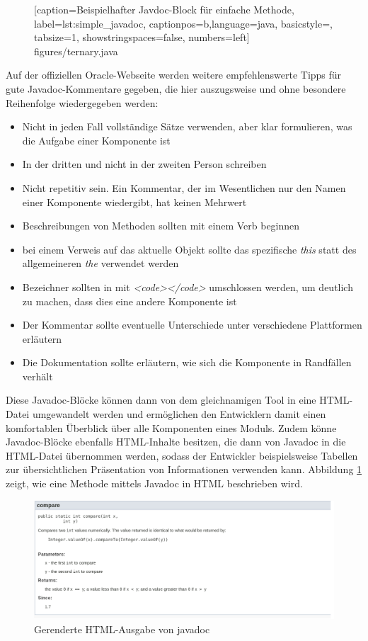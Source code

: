 		\begin{figure}
			
			[caption={Beispielhafter Javdoc-Block für einfache Methode},
			label={lst:simple_javadoc},
			captionpos=b,language=java, basicstyle=\footnotesize, tabsize=1, showstringspaces=false,  numbers=left]
			{figures/ternary.java}
		\end{figure}

Auf der offiziellen Oracle-Webseite werden weitere empfehlenswerte Tipps für gute Javadoc-Kommentare gegeben, die hier auszugsweise und ohne besondere Reihenfolge wiedergegeben werden\cite{HowtoWriteDocCommentsfortheJavadocTool}:
\begin{itemize}
    \item Nicht in jeden Fall vollständige Sätze verwenden, aber klar formulieren, was die Aufgabe einer Komponente ist
    \item In der dritten und nicht in der zweiten Person schreiben
    \item Nicht repetitiv sein. Ein Kommentar, der im Wesentlichen nur den Namen einer Komponente wiedergibt, hat keinen Mehrwert
    \item  Beschreibungen von Methoden sollten mit einem Verb beginnen
    \item bei einem Verweis auf das aktuelle Objekt sollte das spezifische \textit{this} statt des allgemeineren \textit{the} verwendet werden
    \item Bezeichner sollten in mit \textit{<code></code>} umschlossen werden, um deutlich zu machen, dass dies eine andere Komponente ist
    \item Der Kommentar sollte eventuelle Unterschiede unter verschiedene Plattformen erläutern
    \item Die Dokumentation sollte erläutern, wie sich die Komponente in Randfällen verhält
    
\end{itemize}
Diese Javadoc-Blöcke können dann von dem gleichnamigen Tool in eine HTML-Datei umgewandelt werden und ermöglichen den Entwicklern damit einen komfortablen Überblick über alle Komponenten eines Moduls. Zudem könne Javadoc-Blöcke ebenfalls HTML-Inhalte besitzen, die dann von Javadoc in die HTML-Datei übernommen werden, sodass der Entwickler beispielsweise Tabellen zur übersichtlichen Präsentation  von Informationen verwenden kann. Abbildung \ref{fig:javadoc_example_screenshot} zeigt, wie eine Methode mittels Javadoc in HTML beschrieben wird. 
\begin{figure}[h]
    \centering
    \includegraphics[width=\columnwidth]{figures/javadoc_screenshot.png}
    \caption{Gerenderte HTML-Ausgabe von javadoc}
    \label{fig:javadoc_example_screenshot}
\end{figure}

